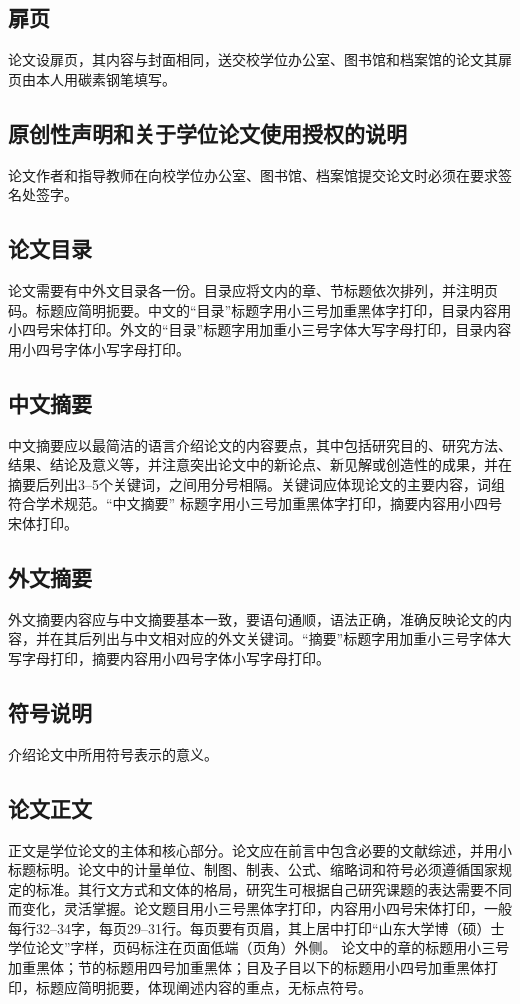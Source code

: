 \subsection{扉页}
论文设扉页，其内容与封面相同，送交校学位办公室、图书馆和档案馆的论文其扉页由本人用碳素钢笔填写。
\subsection{原创性声明和关于学位论文使用授权的说明}
论文作者和指导教师在向校学位办公室、图书馆、档案馆提交论文时必须在要求签名处签字。
\subsection{论文目录}
论文需要有中外文目录各一份。目录应将文内的章、节标题依次排列，并注明页码。标题应简明扼要。中文的“目录”标题字用小三号加重黑体字打印，目录内容用小四号宋体打印。外文的“目录”标题字用加重小三号字体大写字母打印，目录内容用小四号字体小写字母打印。
\subsection{中文摘要}
中文摘要应以最简洁的语言介绍论文的内容要点，其中包括研究目的、研究方法、结果、结论及意义等，并注意突出论文中的新论点、新见解或创造性的成果，并在摘要后列出3--5个关键词，之间用分号相隔。关键词应体现论文的主要内容，词组符合学术规范。“中文摘要” 标题字用小三号加重黑体字打印，摘要内容用小四号宋体打印。
\subsection{外文摘要}
外文摘要内容应与中文摘要基本一致，要语句通顺，语法正确，准确反映论文的内容，并在其后列出与中文相对应的外文关键词。“摘要”标题字用加重小三号字体大写字母打印，摘要内容用小四号字体小写字母打印。
\subsection{符号说明}
介绍论文中所用符号表示的意义。
\subsection{论文正文}
正文是学位论文的主体和核心部分。论文应在前言中包含必要的文献综述，并用小标题标明。论文中的计量单位、制图、制表、公式、缩略词和符号必须遵循国家规定的标准。其行文方式和文体的格局，研究生可根据自己研究课题的表达需要不同而变化，灵活掌握。论文题目用小三号黑体字打印，内容用小四号宋体打印，一般每行32--34字，每页29--31行。每页要有页眉，其上居中打印“山东大学博（硕）士学位论文”字样，页码标注在页面低端（页角）外侧。 论文中的章的标题用小三号加重黑体；节的标题用四号加重黑体；目及子目以下的标题用小四号加重黑体打印，标题应简明扼要，体现阐述内容的重点，无标点符号。
